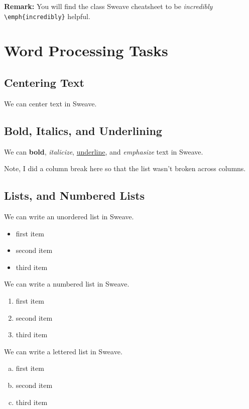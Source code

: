 \documentclass{article}\usepackage[]{graphicx}\usepackage[]{xcolor}
\begin{document}
\begin{multicols}{2}
\noindent \textbf{Remark:} You will find the class Sweave cheatsheet to be \emph{incredibly} \verb|\emph{incredibly}| helpful.

\section{Word Processing Tasks}

\subsection{Centering Text}
\begin{center}
We can center text in Sweave.
\end{center}

\subsection{Bold, Italics, and Underlining}
We can \textbf{bold}, \textit{italicize}, \underline{underline}, and \emph{emphasize} text in Sweave.

Note, I did a column break here so that the list wasn’t broken across columns.

\subsection{Lists, and Numbered Lists}
\noindent We can write an unordered list in Sweave.
\begin{itemize}\itemsep0em
\item first item
\item second item
\item third item
\end{itemize}

\noindent We can write a numbered list in Sweave.
\begin{enumerate}[1.]\itemsep0em
\item first item
\item second item
\item third item
\end{enumerate}

\noindent We can write a lettered list in Sweave.
\begin{enumerate}[a.]\itemsep0em
\item first item
\item second item
\item third item
\end{enumerate}


\end{multicols}
\end{document}
